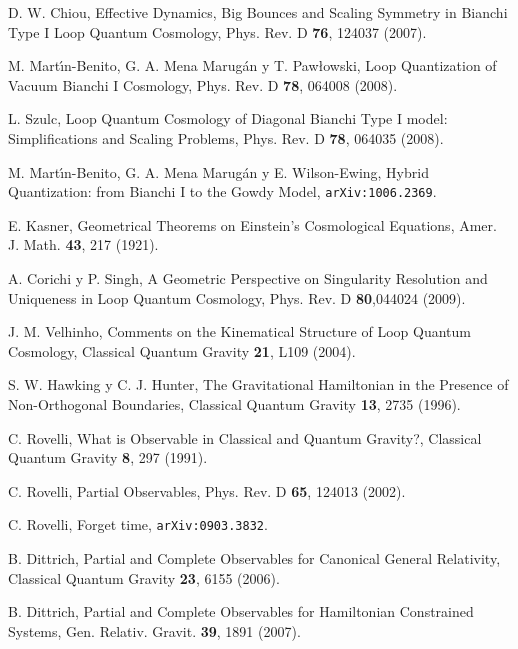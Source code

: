\begin{thebibliography}{999}
D. W. Chiou, Effective Dynamics, Big Bounces and Scaling Symmetry in Bianchi Type I Loop Quantum
Cosmology, Phys. Rev. D {\bf 76}, 124037 (2007).


 M. Mart\'{\i}n-Benito, G. A. Mena Marug\'{a}n y T. Paw{\l}owski, Loop Quantization of
Vacuum Bianchi I Cosmology, Phys. Rev. D {\bf 78}, 064008 (2008).

 L. Szulc, Loop Quantum Cosmology of Diagonal Bianchi Type I model: Simplifications
and Scaling Problems, Phys. Rev. D {\bf78}, 064035 (2008).

 M. Mart\'{\i}n-Benito, G. A. Mena Marug\'{a}n y E. Wilson-Ewing, Hybrid Quantization:
from Bianchi I to the Gowdy Model, \texttt{arXiv:1006.2369}.

 E. Kasner, Geometrical Theorems on Einstein's Cosmological Equations, Amer. J.
Math. {\bf43}, 217 (1921).


 A. Corichi y P. Singh, A Geometric Perspective on Singularity Resolution and
Uniqueness in Loop Quantum Cosmology, Phys. Rev. D {\bf80},044024 (2009).

 J. M. Velhinho, Comments on the Kinematical Structure of Loop Quantum Cosmology, 
Classical Quantum Gravity {\bf21}, L109 (2004). 



 S. W. Hawking y C. J. Hunter, The Gravitational Hamiltonian in the Presence of
Non-Orthogonal Boundaries, Classical Quantum Gravity {\bf13}, 2735 (1996).

 C. Rovelli, What is Observable in Classical and Quantum Gravity?, Classical
Quantum Gravity {\bf8}, 297 (1991).

 C. Rovelli, Partial Observables, Phys. Rev. D {\bf65}, 124013
(2002).

 C. Rovelli, Forget time, \texttt{arXiv:0903.3832}.

 B. Dittrich, Partial and Complete Observables for Canonical General
Relativity,
Classical Quantum Gravity {\bf23}, 6155 (2006).

 B. Dittrich, Partial and Complete Observables for Hamiltonian
Constrained Systems, Gen. Relativ. Gravit. {\bf39}, 1891 (2007).


\end{thebibliography}
